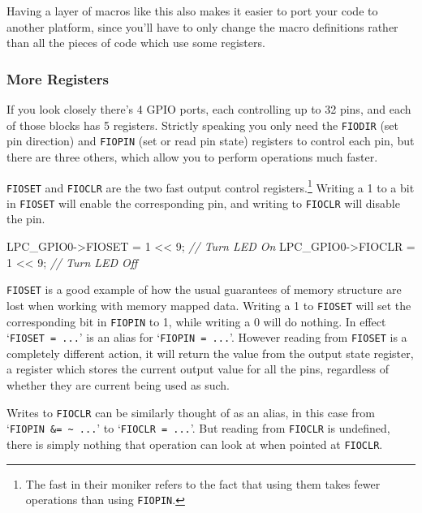 \documentclass[]{article}
\newenvironment{Shaded}{\begin{snugshade}}{\end{snugshade}}
\newcommand{\DecValTok}[1]{\textcolor[rgb]{0.00,0.00,0.81}{{#1}}}
\newcommand{\CommentTok}[1]{\textcolor[rgb]{0.56,0.35,0.01}{\textit{{#1}}}}
\newcommand{\NormalTok}[1]{{#1}}
\begin{document}
Having a layer of macros like this also makes it easier to port your
code to another platform, since you'll have to only change the macro
definitions rather than all the pieces of code which use some registers.

\subsubsection{More Registers}

If you look closely there's 4 GPIO ports, each controlling up to 32
pins, and each of those blocks has 5 registers. Strictly speaking you
only need the \texttt{FIODIR} (set pin direction) and \texttt{FIOPIN}
(set or read pin state) registers to control each pin, but there are
three others, which allow you to perform operations much faster.

\texttt{FIOSET} and \texttt{FIOCLR} are the two fast output control
registers.\footnote{The fast in their moniker refers to the fact that
  using them takes fewer operations than using \texttt{FIOPIN}.} Writing
a 1 to a bit in \texttt{FIOSET} will enable the corresponding pin, and
writing to \texttt{FIOCLR} will disable the pin.

\begin{Shaded}
\begin{Highlighting}[]
    \NormalTok{LPC_GPIO0->FIOSET = }\DecValTok{1} \NormalTok{<< }\DecValTok{9}\NormalTok{; }\CommentTok{// Turn LED On}
    \NormalTok{LPC_GPIO0->FIOCLR = }\DecValTok{1} \NormalTok{<< }\DecValTok{9}\NormalTok{; }\CommentTok{// Turn LED Off}
\end{Highlighting}
\end{Shaded}

\texttt{FIOSET} is a good example of how the usual guarantees of memory
structure are lost when working with memory mapped data. Writing a 1 to
\texttt{FIOSET} will set the corresponding bit in \texttt{FIOPIN} to 1,
while writing a 0 will do nothing. In effect `\texttt{FIOSET = ...}' is
an alias for `\texttt{FIOPIN \textbar{}= ...}'. However reading from
\texttt{FIOSET} is a completely different action, it will return the
value from the output state register, a register which stores the
current output value for all the pins, regardless of whether they are
current being used as such.

Writes to \texttt{FIOCLR} can be similarly thought of as an alias, in
this case from `\texttt{FIOPIN \&= \textasciitilde{} ...}' to
`\texttt{FIOCLR = ...}'. But reading from \texttt{FIOCLR} is undefined,
there is simply nothing that operation can look at when pointed at
\texttt{FIOCLR}.
\end{document}
